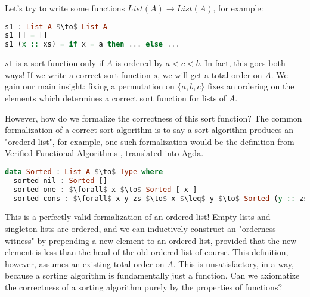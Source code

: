 Let's try to write some functions $List(A) \to List(A)$, for example:
\begin{lstlisting}[language=haskell]
s1 : List A $\to$ List A
s1 [] = []
s1 (x :: xs) = if x = a then ... else ...
\end{lstlisting}
$s1$ is a sort function only if $A$ is ordered by $a < c < b$.
In fact, this goes both ways!
If we write a correct sort function $s$, we will get a total order on $A$.
We gain our main insight: fixing a permutation on $\{a,b,c\}$ fixes an ordering on the elements which determines a correct sort function for lists of $A$.


However, how do we formalize the correctness of this sort function?
The common formalization of a correct sort algorithm is to say a sort algorithm produces
an "orederd list", for example, one such formalization would be the definition
from Verified Functional Algorithms \cite{appel2016verified}, translated into Agda.

\begin{lstlisting}[language=Haskell]
data Sorted : List A $\to$ Type where
  sorted-nil : Sorted []
  sorted-one : $\forall$ x $\to$ Sorted [ x ]
  sorted-cons : $\forall$ x y zs $\to$ x $\leq$ y $\to$ Sorted (y :: zs) $\to$ Sorted (x :: y :: zs)
\end{lstlisting}

This is a perfectly valid formalization of an ordered list! Empty lists and singleton lists
are ordered, and we can inductively construct an "orderness witness" by prepending a new element
to an ordered list, provided that the new element is less than the head of the old ordered list of
course. This definition, however, assumes an existing total order on $A$. This is
unsatisfactory, in a way, because a sorting algorithm is fundamentally just a function. Can we
axiomatize the correctness of a sorting algorithm purely by the properties of functions?

